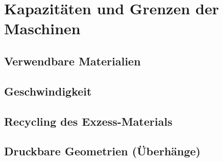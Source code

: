 \documentclass[12pt]{article}
\begin{document}

%
\pagebreak
\pagebreak
{}
\tableofcontents
\pagebreak



\section{Kapazitäten und Grenzen der Maschinen}
\subsection{Verwendbare Materialien}
\subsection{Geschwindigkeit}
\subsection{Recycling des Exzess-Materials}
\subsection{Druckbare Geometrien (Überhänge)}


\pagebreak
\pagebreak

\printnoidxglossary[sort=use, type=\acronymtype]
\printnoidxglossary[sort=use]

\pagebreak
\printbibliography[filter=def]

\pagebreak
\newrefcontext[sorting=none,labelprefix={Web\space}]
\printbibliography[title={Web-Quellen}, filter=web]

\pagebreak
\listoffigures
\end{document}
